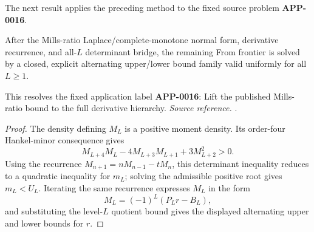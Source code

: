 The next result applies the preceding method to the fixed source problem \textbf{APP-0016}.
\begin{corollary}
\label{res:from-mills-explicit-bound-family-frontier}
After the Mills-ratio Laplace/complete-monotone normal form, derivative recurrence, and all-\(L\) determinant bridge, the remaining From frontier is solved by a closed, explicit alternating upper/lower bound family valid uniformly for all \(L\ge1\).

This resolves the fixed application label \textbf{APP-0016}: Lift the published Mills-ratio bound to the full derivative hierarchy.
\emph{Source reference.} \cite{app-app-0016-source}.
\end{corollary}
\begin{proof}
The density defining \(M_L\) is a positive moment density.  Its order-four
Hankel-minor consequence gives
\[
M_{L+4}M_L-4M_{L+3}M_{L+1}+3M_{L+2}^2>0.
\]
Using the recurrence \(M_{n+1}=nM_{n-1}-tM_n\), this determinant inequality
reduces to a quadratic inequality for \(m_L\); solving the admissible positive
root gives \(m_L<U_L\).  Iterating the same recurrence expresses \(M_L\) in the
form
\[
M_L=(-1)^L(P_L r-B_L),
\]
and substituting the level-\(L\) quotient bound gives the displayed alternating
upper and lower bounds for \(r\).
\end{proof}
